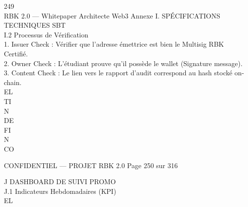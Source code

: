 \vspace{0.5em}
\vspace{0.5em}
\vspace{0.5em}
249\\
RBK 2.0 — Whitepaper Architecte Web3                                                       Annexe I. SPÉCIFICATIONS TECHNIQUES SBT\\
\vspace{0.5em}
\vspace{0.5em}
\vspace{0.5em}
I.2 Processus de Vérification\\
1. Issuer Check : Vérifier que l’adresse émettrice est bien le Multisig RBK Certifié.\\
\vspace{0.5em}
2. Owner Check : L’étudiant prouve qu’il possède le wallet (Signature message).\\
\vspace{0.5em}
3. Content Check : Le lien vers le rapport d’audit correspond au hash stocké on-chain.\\
\vspace{0.5em}
\vspace{0.5em}
\vspace{0.5em}
\vspace{0.5em}
EL\\
TI\\
N\\
DE\\
FI\\
N\\
CO\\
\vspace{0.5em}
\vspace{0.5em}
\vspace{0.5em}
\vspace{0.5em}
\begin{confidential}CONFIDENTIEL — PROJET RBK 2.0                                           Page 250 sur 316\end{confidential}
J \textbar{} DASHBOARD DE SUIVI PROMO\\
\vspace{0.5em}
\vspace{0.5em}
J.1 Indicateurs Hebdomadaires (KPI)\\
\vspace{0.5em}
\vspace{0.5em}
\vspace{0.5em}
\vspace{0.5em}
EL\\
